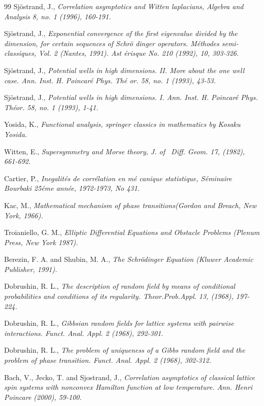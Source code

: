 \documentclass{article}
\begin{document}
\begin{thebibliography}{99}
\bibitem{} Sj\"{o}strand, J., \textit{Correlation asymptotics and Witten
laplacians, Algebra and Analysis 8, no. 1 (1996), 160-191.}

\bibitem{} Sj\"{o}strand, J., \textit{Exponential convergence of the first
eigenvalue divided by the dimension, for certain sequences of Schr\"{o}%
dinger operators. M\'{e}thodes semi-classiques, Vol. 2 (Nantes, 1991). Ast%
\'{e}risque No. 210 (1992), 10, 303-326.}

\bibitem{} Sj\"{o}strand, J., \textit{Potential wells in high dimensions.
II. More about the one well case. Ann. Inst. H. Poincar\'{e} Phys. Th\'{e}%
or. 58, no. 1 (1993), 43-53.}

\bibitem{} Sj\"{o}strand, J., \textit{Potential wells in high dimensions. I.
Ann. Inst. H. Poincar\'{e} Phys. Th\'{e}or. 58, no. 1 (1993), 1-41.}

\bibitem{} Yosida, K., \textit{Functional analysis, springer classics in
mathematics by Kosaku Yosida.}

\bibitem{} Witten, E., \textit{Supersymmetry and Morse theory, J. of \ Diff.
Geom. 17, (1982), 661-692.}

\bibitem{} Cartier, P., \textit{Inegalit\'{e}s de corr\'{e}lation en m\'{e}%
canique statistique, S\'{e}minaire Bourbaki 25\'{e}me ann\'{e}e, 1972-1973,
No 431.}

\bibitem{} Kac, M., \textit{Mathematical mechanism of phase
transitions(Gordon and Breach, New York, 1966).}

\bibitem{} Troianiello, G. M., \textit{Elliptic Differential Equations and
Obstacle Problems (Plenum Press, New York 1987).}

\bibitem{} Berezin, F. A. and Shubin, M. A., \textit{The Schr\"{o}dinger
Equation (Kluwer Academic Publisher, 1991).}

\bibitem{} Dobrushin, R. L., \textit{The description of random field by
means of conditional probabilities and conditions of its regularity.
Theor.Prob.Appl. 13, (1968), 197-224.}

\bibitem{} Dobrushin, R. L., \textit{Gibbsian random fields for lattice
systems with pairwise interactions. Funct. Anal. Appl. 2 (1968), 292-301.}

\bibitem{} Dobrushin, R. L., \textit{The problem of uniqueness of a Gibbs
random field and the problem of phase transition. Funct. Anal. Appl. 2
(1968), 302-312.}

\bibitem{} Bach, V., Jecko, T. and Sjostrand, J., \textit{Correlation
asymptotics of classical lattice spin systems with nonconvex Hamilton
function at low temperature. Ann. Henri Poincare (2000), 59-100.}


\end{thebibliography}
\end{document}
